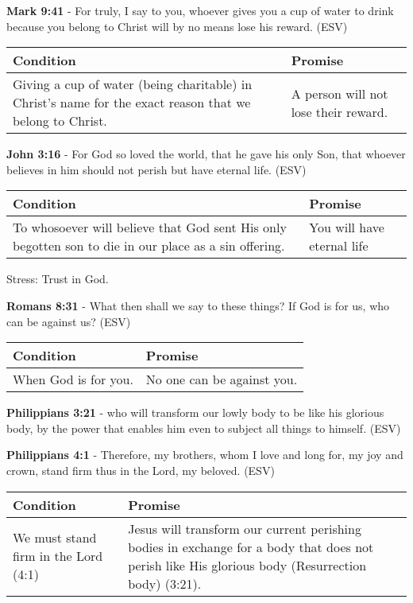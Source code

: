 \documentclass[11pt]{article}
\begin{document}
\textbf{Mark 9:41} - For truly, I say to you, whoever gives you a cup of water to drink because you belong to Christ will by no means lose his reward. (ESV)

\begin{center}
\begin{tabular}{ll}
Condition & Promise\\[0pt]
\hline
Giving a cup of water (being charitable) in Christ's name for the exact reason that we belong to Christ. & A person will not lose their reward.\\[0pt]
\end{tabular}
\end{center}

\textbf{John 3:16} - For God so loved the world, that he gave his only Son, that whoever believes in him should not perish but have eternal life. (ESV)

\begin{center}
\begin{tabular}{ll}
Condition & Promise\\[0pt]
\hline
To whosoever will believe that God sent His only begotten son to die in our place as a sin offering. & You will have eternal life\\[0pt]
\end{tabular}
\end{center}

Stress: Trust in God.

\textbf{Romans 8:31} - What then shall we say to these things? If God is for us, who can be against us? (ESV)

\begin{center}
\begin{tabular}{ll}
Condition & Promise\\[0pt]
\hline
When God is for you. & No one can be against you.\\[0pt]
\end{tabular}
\end{center}

\textbf{Philippians 3:21} - who will transform our lowly body to be like his glorious body, by the power that enables him even to subject all things to himself. (ESV)

\textbf{Philippians 4:1} - Therefore, my brothers, whom I love and long for, my joy and crown, stand firm thus in the Lord, my beloved. (ESV)

\begin{center}
\begin{tabular}{ll}
Condition & Promise\\[0pt]
\hline
We must stand firm in the Lord (4:1) & Jesus will transform our current perishing bodies in exchange for a body that does not perish like His glorious body (Resurrection body) (3:21).\\[0pt]
\end{tabular}
\end{center}
\end{document}
